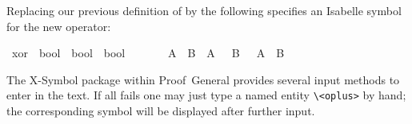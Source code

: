 \begin{isabellebody}
\begin{isamarkuptext}
  Replacing our previous definition of  by the
  following specifies an Isabelle symbol for the new operator:%
\end{isamarkuptext}%
\isamarkuptrue%
%
\isadelimML
%
\endisadelimML
%
\isatagML
%
\endisatagML
{\isafoldML}%
%
\isadelimML
%
\endisadelimML
{}\isamarkupfalse%
\ xor\ {}{}\ {}bool\ {}\ bool\ {}\ bool{}\ \ \ \ {}\ {}{}{}\ {}{}{}\isanewline
{}\ {}A\ {}\ B\ {}\ {}A\ {}\ {}\ B{}\ {}\ {}{}\ A\ {}\ B{}{}%
\isadelimML
%
\endisadelimML
%
\isatagML
%
\endisatagML
{\isafoldML}%
%
\isadelimML
%
\endisadelimML
%
\begin{isamarkuptext}%
\noindent The X-Symbol package within Proof~General provides several
  input methods to enter  in the text.  If all fails one may
  just type a named entity \verb,\,\verb,<oplus>, by hand; the
  corresponding symbol will be displayed after further input.


\end{isamarkuptext}
\end{isabellebody}

